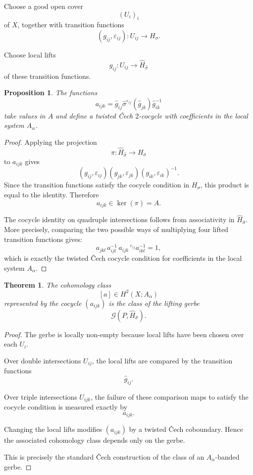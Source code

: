 \documentclass[11pt]{amsart}
\newtheorem{theorem}[definition]{Theorem}
\newtheorem{proposition}[definition]{Proposition}
\begin{document}
Choose a good open cover
\[
(U_i)_i
\]
of \(X\), together with transition functions
\[
(g_{ij},\varepsilon_{ij})
:
U_{ij}\to H_\sigma.
\]

Choose local lifts
\[
\widehat g_{ij}:U_{ij}\to \widehat H_{\widehat\sigma}
\]
of these transition functions.

\begin{proposition}
The functions
\[
a_{ijk}
=
\widehat g_{ij}
\widehat\sigma^{\varepsilon_{ij}}(\widehat g_{jk})
\widehat g_{ik}^{-1}
\]
take values in \(A\) and define a twisted Čech \(2\)-cocycle with coefficients
in the local system \(A_\alpha\).
\end{proposition}

\begin{proof}
Applying the projection
\[
\pi:\widehat H_{\widehat\sigma}\to H_\sigma
\]
to \(a_{ijk}\) gives
\[
(g_{ij},\varepsilon_{ij})
(g_{jk},\varepsilon_{jk})
(g_{ik},\varepsilon_{ik})^{-1}.
\]
Since the transition functions satisfy the cocycle condition in
\(H_\sigma\), this product is equal to the identity. Therefore
\[
a_{ijk}\in \ker(\pi)=A.
\]

The cocycle identity on quadruple intersections follows from associativity in
\(\widehat H_{\widehat\sigma}\). More precisely, comparing the two possible
ways of multiplying four lifted transition functions gives:
\[
a_{jkl}\,
a_{ijl}^{-1}\,
a_{ijk}\,
{}^{\varepsilon_{ij}}a_{ikl}^{-1}
=
1,
\]
which is exactly the twisted Čech cocycle condition for coefficients in the
local system \(A_\alpha\).
\end{proof}

\begin{theorem}
The cohomology class
\[
[a]\in H^2(X;A_\alpha)
\]
represented by the cocycle \((a_{ijk})\) is the class of the lifting gerbe
\[
\mathcal G(P,\widehat H_{\widehat\sigma}).
\]
\end{theorem}

\begin{proof}
The gerbe is locally non-empty because local lifts have been chosen over each
\(U_i\).

Over double intersections \(U_{ij}\), the local lifts are compared by the
transition functions
\[
\widehat g_{ij}.
\]

Over triple intersections \(U_{ijk}\), the failure of these comparison maps to
satisfy the cocycle condition is measured exactly by
\[
a_{ijk}.
\]

Changing the local lifts modifies \((a_{ijk})\) by a twisted Čech
coboundary. Hence the associated cohomology class depends only on the gerbe.

This is precisely the standard Čech construction of the class of an
\(A_\alpha\)-banded gerbe.
\end{proof}
\end{document}
